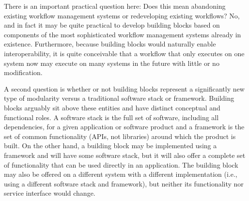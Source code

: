 There is an important practical question here: Does this mean abandoning
existing workflow management systems or redeveloping existing workflows? No, and
in fact it may be quite practical to develop building blocks based on components
of the most sophisticated workflow management systems already in existence.
Furthermore, because building blocks would naturally enable interoperability, it
is quite conceivable that a workflow that only executes on one system now may
execute on many systems in the future with little or no modification. 

A second question is whether or not building blocks represent a significantly new
type of modularity versus a traditional software stack or framework. Building blocks
arguably sit above these entities and have distinct conceptual and functional roles.
A software stack is the full set of software, including all dependencies, for a given
application or software product and a framework is the set of common functionality
(APIs, not libraries) around which the product is built. On the other hand, a
building block may be implemented using a framework and will have some software stack,
but it will also offer a complete set of functionality that can be used directly in
an application. The building block may also be offered on a different system with a
different implementation (i.e., using a different software stack and framework), but neither its functionality nor service interface would change.
